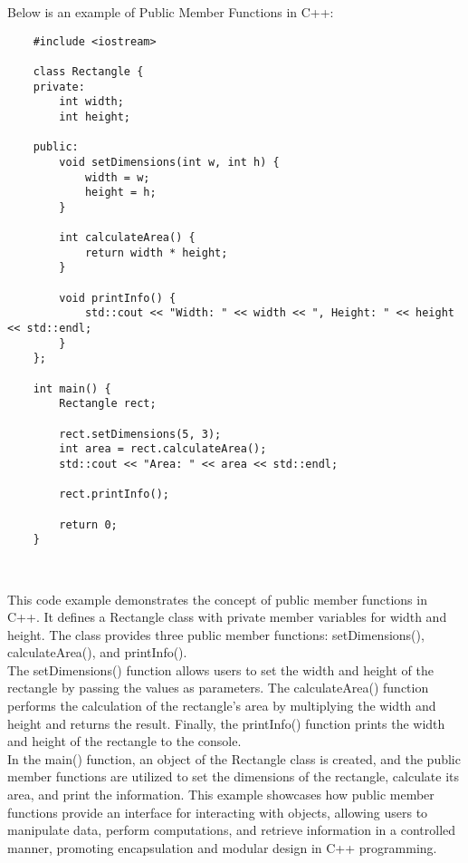 \begin{solution}
    Below is an example of Public Member Functions in C++: \\
    \horizontalline
    \begin{verbatim}
    #include <iostream>

    class Rectangle {
    private:
        int width;
        int height;
        
    public:
        void setDimensions(int w, int h) {
            width = w;
            height = h;
        }
        
        int calculateArea() {
            return width * height;
        }
        
        void printInfo() {
            std::cout << "Width: " << width << ", Height: " << height << std::endl;
        }
    };
    
    int main() {
        Rectangle rect;
        
        rect.setDimensions(5, 3);
        int area = rect.calculateArea();
        std::cout << "Area: " << area << std::endl;
        
        rect.printInfo();
        
        return 0;
    }
    \end{verbatim} \\
    \horizontalline

    This code example demonstrates the concept of public member functions in C++. It defines a Rectangle class with private member variables for width and height. The class provides three public member functions: setDimensions(), calculateArea(), and printInfo(). \\

    \noindent The setDimensions() function allows users to set the width and height of the rectangle by passing the values as parameters. The calculateArea() function performs the calculation of the rectangle's area by multiplying the width and height and returns the 
    result. Finally, the printInfo() function prints the width and height of the rectangle to the console. \\

    \noindent In the main() function, an object of the Rectangle class is created, and the public member functions are utilized to set the dimensions of the rectangle, calculate its area, and print the information. This example showcases how public member functions 
    provide an interface for interacting with objects, allowing users to manipulate data, perform computations, and retrieve information in a controlled manner, promoting encapsulation and modular design in C++ programming. \\
\end{solution}

